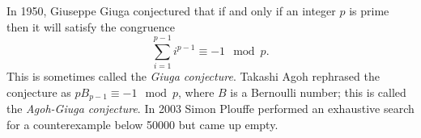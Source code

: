 \documentclass[12pt]{article}
\begin{document}
In 1950, Giuseppe Giuga conjectured that if and only if an integer $p$ is prime then it will satisfy the congruence $$\sum_{i = 1}^{p - 1} i^{p - 1} \equiv -1 \mod p.$$ This is sometimes called the \emph{Giuga conjecture}. Takashi Agoh rephrased the conjecture as $pB_{p - 1} \equiv -1 \mod p$, where $B$ is a Bernoulli number; this is called the \emph{Agoh-Giuga conjecture}. In 2003 Simon Plouffe performed an exhaustive search for a counterexample below 50000 but came up empty.
\end{document}
